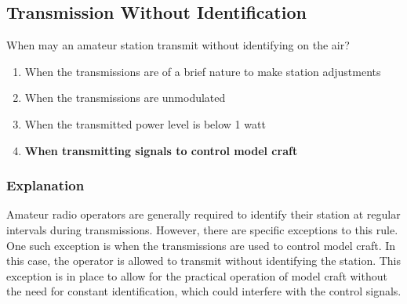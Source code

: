 \subsection{Transmission Without Identification}
\label{T1D11}

\begin{tcolorbox}[colback=gray!10!white,colframe=black!75!black,title=T1D11]
When may an amateur station transmit without identifying on the air?
\begin{enumerate}[label=\Alph*),noitemsep]
    \item When the transmissions are of a brief nature to make station adjustments
    \item When the transmissions are unmodulated
    \item When the transmitted power level is below 1 watt
    \item \textbf{When transmitting signals to control model craft}
\end{enumerate}
\end{tcolorbox}

\subsubsection*{Explanation}
Amateur radio operators are generally required to identify their station at regular intervals during transmissions. However, there are specific exceptions to this rule. One such exception is when the transmissions are used to control model craft. In this case, the operator is allowed to transmit without identifying the station. This exception is in place to allow for the practical operation of model craft without the need for constant identification, which could interfere with the control signals.